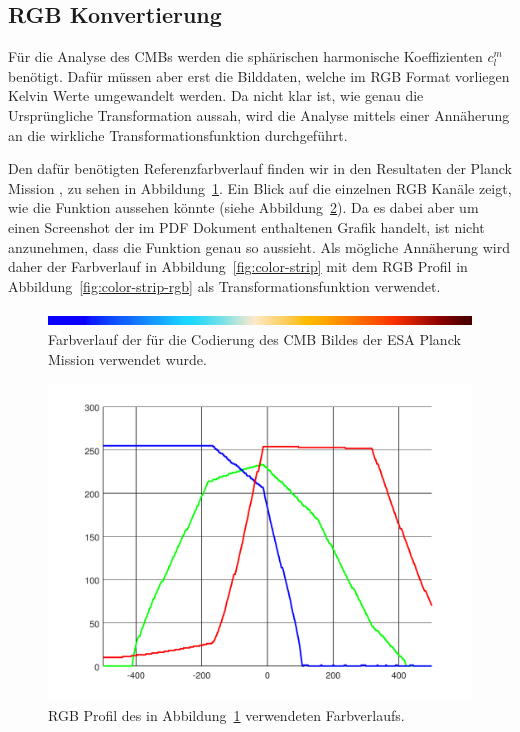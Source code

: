 \subsection{RGB Konvertierung}

Für die Analyse des CMBs werden die sphärischen harmonische Koeffizienten 
$c_l^m$ benötigt. Dafür müssen aber erst die Bilddaten, welche im RGB Format 
vorliegen Kelvin Werte umgewandelt werden. Da nicht klar ist, wie genau die 
Ursprüngliche Transformation aussah, wird die Analyse mittels einer Annäherung 
an die wirkliche Transformationsfunktion durchgeführt.

Den dafür benötigten Referenzfarbverlauf finden wir in den Resultaten der 
Planck Mission \cite{planck_overview}, zu sehen in 
Abbildung~\ref{fig:color-strip-orig}. Ein Blick auf die einzelnen RGB Kanäle 
zeigt, wie die Funktion aussehen könnte (siehe 
Abbildung~\ref{fig:color-strip-orig-rgb}). Da es dabei aber um einen Screenshot 
der im PDF Dokument enthaltenen Grafik handelt, ist nicht anzunehmen, dass die 
Funktion genau so aussieht. Als mögliche Annäherung wird daher der Farbverlauf 
in Abbildung~\ref{fig:color-strip} mit dem RGB Profil in 
Abbildung~\ref{fig:color-strip-rgb} als Transformationsfunktion verwendet.



\begin{figure}
	\centering
	\includegraphics[width=\linewidth]{cmb/images/color-strip-full.png}
	\caption{Farbverlauf der für die Codierung des CMB Bildes der ESA Planck 
		Mission verwendet wurde.}
	\label{fig:color-strip-orig}
\end{figure}

\begin{figure}
	\centering
	\includegraphics[width=\linewidth]{cmb/converter/rgb-graph.pdf}
	\caption{RGB Profil des in Abbildung~\ref{fig:color-strip-orig} 
		verwendeten Farbverlaufs.}
	\label{fig:color-strip-orig-rgb}
\end{figure}

